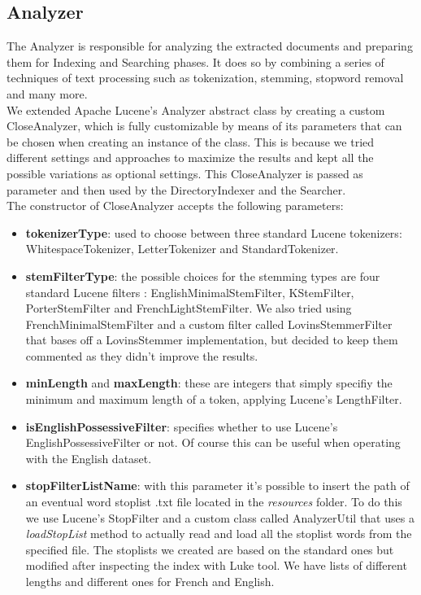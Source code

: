 \begin{itemize}
\subsection{Analyzer}
The Analyzer is responsible for analyzing the extracted documents and preparing them for Indexing and Searching phases. It does so by combining a series of techniques of text processing such as tokenization, stemming, stopword removal and many more.\\
We extended Apache Lucene's Analyzer abstract class by creating a custom CloseAnalyzer, which is fully customizable by means of its parameters that can be chosen when creating an instance of the class. This is because we tried different settings and approaches to maximize the results and kept all the possible variations as optional settings.
This CloseAnalyzer is passed as parameter and then used by the DirectoryIndexer and the Searcher. \\
The constructor of CloseAnalyzer accepts the following parameters:
\begin{itemize}
  \item \textbf{tokenizerType}: used to choose between three standard Lucene tokenizers: WhitespaceTokenizer, LetterTokenizer and StandardTokenizer.
  \item \textbf{stemFilterType}: the possible choices for the stemming types are four standard Lucene filters : EnglishMinimalStemFilter, KStemFilter, PorterStemFilter and FrenchLightStemFilter. We also tried using FrenchMinimalStemFilter and a custom filter called LovinsStemmerFilter that bases off a LovinsStemmer implementation, but decided to keep them commented as they didn't improve the results.
  \item \textbf{minLength} and \textbf{maxLength}: these are integers that simply specifiy the minimum and maximum length of a token, applying Lucene's LengthFilter.
  \item \textbf{isEnglishPossessiveFilter}: specifies whether to use Lucene's EnglishPossessiveFilter or not. Of course this can be useful when operating with the English dataset.
  \item \textbf{stopFilterListName}: with this parameter it's possible to insert the path of an eventual word stoplist .txt file located in the \textit{resources} folder. To do this we use Lucene's StopFilter and a custom class called AnalyzerUtil that uses a \textit{loadStopList} method to actually read and load all the stoplist words from the specified file. The stoplists we created are based on the standard ones but modified after inspecting the index with Luke tool. We have lists of different lengths and different ones for French and English.

\end{itemize}
\end{itemize}
